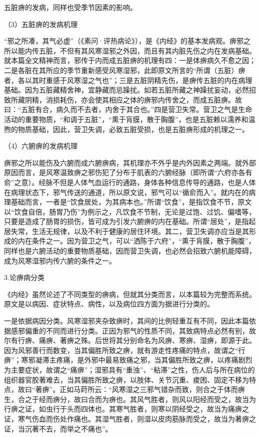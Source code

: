 \documentclass[draft,12pt]{ctexbook}
\begin{document}
五脏痹的发病，同样也受季节因素的影响。

（3）五脏痹的发病机理

“邪之所凑，其气必虚”（《素问·评热病论》），是《内经》的基本发病观。痹邪之所以能内传五脏，不但有其风寒湿邪之外因，而且有其内脏先伤之内在发病基础。就本篇全文精神而言，邪传于内而成五脏痹的机理有四：一是体痹病久不愈之因；二是各脏在其所应的季节重新感受风寒湿邪，此即原文所言的“所谓（五脏）痹者，各以其时重感于风寒湿之气也”；三是五脏阴精先伤，是痹传五脏的内在病理基础。因为五脏藏精舍神，宜静藏而忌躁扰。如若五脏所藏之神躁扰妄动，必然招致所藏阴精，消损耗伤，亦会使其相应之体的痹邪内传舍之，而成五脏痹。故曰：“五脏有合，病久而不去者，内舍于其合也。”四是营卫失常。营卫之气是生命活动的重要物质，“和调于五脏”，“熏于肓膜，散于胸腹”，也是五脏赖以濡养和温煦的物质基础，因此，营卫失调，必致五脏受损，也是五脏痹形成的机理之一。

（4）六腑痹的发病机理

痹邪之所以能伤及六腑而成六腑痹病，其机理亦不外乎是内外因素之两端。就外部原因而言，是风寒温致痹之邪伤犯了分布于肌表的六腑经脉（即所谓“六府亦各有俞”之意）。经脉不但是人体气血运行的通路，身体各种信息传导的通路，也是人体在病理状态下，邪气传送的通道，所以原文说，邪气可以“循俞而入”。就内在的病理基础而言，一者是“饮食居处，为其病本也。”所谓“饮食”，是指饮食不节，原文以“饮食自倍，肠胃乃伤”为例示之，凡饮食不节制，无论是过饱、过饥、偏嗜等，只要是造成了肠胃的损伤，皆可成为引发六腑痹的内在基础。所谓“居处”，是指起居失常，生活无规律，以及不利于健康的居住环境。其二，营卫失调亦应当是其形成的内在条件之一。因为营卫之气，可以“洒陈于六府”，“熏于肓膜，散于胸腹”，同样也是六腑活动的重要物质基础，因而营卫失调，也必然会招致六腑机能障碍，成为风寒湿邪内传六腑的条件之一。

3.论痹病分类

《内经》虽然论述了不同类型的痹病，但就其分类而言，以本篇较为完整而系统。原文是以病因、症状特点、病性，以及病位四方面为据进行分类的。

一是依据病因分类。风寒湿邪夹杂致痹时，其间的比例轻重互有不同，因此本篇依据感邪偏重的不同而进行分类。正因为邪气的性质不同，其致病特点必然有别，故尔有行痹、痛痹、著痹之殊。后世将其分别命名为风痹、寒痹、湿痹，即源于此。因为风邪善行而数变，当其偏胜所致之痹，就有游走性疼痛的特点，故谓之“行痹”；寒邪凝滞主疼痛，是外邪中最易致痛之邪，当其偏胜所致之痹，以疼痛剧烈为主要症状，故谓之“痛痹”；湿邪具有“重浊”、“粘滞”之性，伤人后与所在病位的组织器官胶著难去，当其偏胜所致之痹，以肢体、关节沉重、痠困、固定不移为特点，故曰“著痹”。正如马莳所云：“风寒湿之三邪气错杂而致，则合之于体而痹生，合之于经而痹分，故曰合而为痹也。其风气胜者，则风以阳经而受之，故当为行痹之证，如虫行于头而四体也。其寒气胜者，则寒以阴经受之，故当为痛痹之证，寒气伤血而伤处作痛也。其湿气胜者，则湿以皮肉筋脉而受之，故当为著痹之证，当沉著不去，而举之不痛也”。
\end{document}
